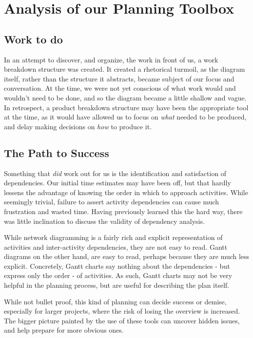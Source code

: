 \section{Analysis of our Planning Toolbox}
\label{sec:AnalysisPlanning}
\subsection{Work to do}
In an attempt to discover, and organize, the work in front of us, a work
breakdown structure was created. It created a rhetorical turmoil, as the
diagram itself, rather than the structure it abstracts, became subject of our
focus and conversation. At the time, we were not yet conscious of what work
would and wouldn't need to be done, and so the diagram became a little shallow
and vague. In retrospect, a product breakdown structure may have been the
appropriate tool at the time, as it would have allowed us to focus on
\emph{what} needed to be produced, and delay making decisions on \emph{how} to
produce it\cite[ch.~8.3,~8.4]{caye}.

\subsection{The Path to Success}
Something that \emph{did} work out for us is the identification and satisfaction
of dependencies. Our initial time estimates may have been off, but that hardly
lessens the advantage of knowing the order in which to approach activities.
While seemingly trivial, failure to assert activity dependencies can cause much
frustration and wasted time. Having previously learned this the hard way, there
was little inclination to discuss the validity of dependency analysis.

While network diagramming is a fairly rich and explicit representation of
activities and inter-activity dependencies, they are not easy to read.  Gantt
diagrams on the other hand, are easy to read, perhaps because they are much less
explicit. Concretely, Gantt charts say nothing about the dependencies - but
express only the order - of activities. As such, Gantt charts may not be very
helpful in the planning process, but are useful for describing the plan itself.
\cite[ch.~8.6]{caye}

While not bullet proof, this kind of planning can decide success or
demise\cite[ch.~8]{caye}, especially for larger projects, where the risk of
losing the overview is increased. The bigger picture painted by the use of
these tools can uncover hidden issues, and help prepare for more obvious ones.
